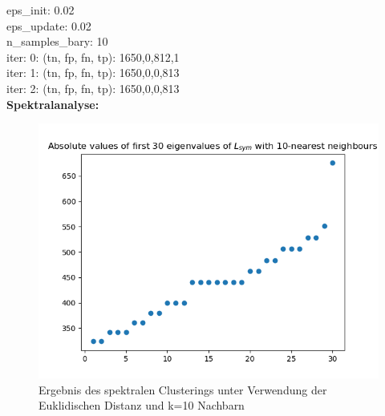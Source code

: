 \documentclass[twoside, 11pt,a4paper]{article}
\numberwithin{equation}{section}
\begin{document}
	eps\_init: 0.02\\
	eps\_update: 0.02\\
	n\_samples\_bary: 10\\
	iter: 0: (tn, fp, fn, tp): 1650,0,812,1\\
	iter: 1: (tn, fp, fn, tp): 1650,0,0,813\\
	iter: 2: (tn, fp, fn, tp): 1650,0,0,813\\
	
	\newpage
	\noindent \textbf{Spektralanalyse:}
	\begin{figure}[h]
		\begin{center}
			\includegraphics[width=0.5\textheight]{specClustering_l2_k10.png}
			\caption{Ergebnis des spektralen Clusterings unter Verwendung der Euklidischen Distanz und k=10 Nachbarn}
		\end{center}
	\end{figure}
	
\end{document}
